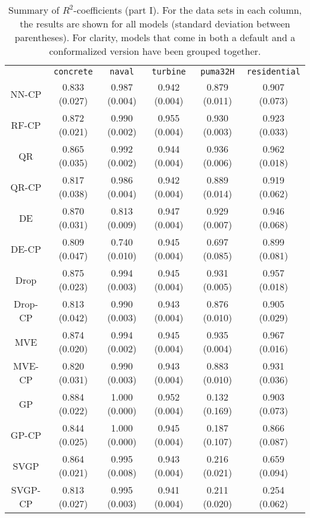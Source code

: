 \documentclass[smallcondensed]{svjour3}
\begin{document}
\begin{appendices}
    \begin{table}[ht!]
        \scriptsize
        \centering
        \renewcommand{\arraystretch}{1.5}
        \begin{tabular}{c||c|c|c|c|c}
            &\texttt{concrete}&\texttt{naval}&\texttt{turbine}&\texttt{puma32H}&\texttt{residential}\\
            \hhline{======}
            NN-CP&0.833 (0.027)&0.987 (0.004)&0.942 (0.004)&0.879 (0.011)&0.907 (0.073)\\
            \hdashline
            RF-CP&0.872 (0.021)&0.990 (0.002)&0.955 (0.004)&0.930 (0.003)&0.923 (0.033)\\
            \hdashline
            QR&0.865 (0.035)&0.992 (0.002)&0.944 (0.004)&0.936 (0.006)&0.962 (0.018)\\
            QR-CP&0.817 (0.038)&0.986 (0.004)&0.942 (0.004)&0.889 (0.014)&0.919 (0.062)\\
            \hdashline
            DE&0.870 (0.031)&0.813 (0.009)&0.947 (0.004)&0.929 (0.007)&0.946 (0.068)\\
            DE-CP&0.809 (0.047)&0.740 (0.010)&0.945 (0.004)&0.697 (0.085)&0.899 (0.081)\\
            \hdashline
            Drop&0.875 (0.023)&0.994 (0.003)&0.945 (0.004)&0.931 (0.005)&0.957 (0.018)\\
            Drop-CP&0.813 (0.042)&0.990 (0.003)&0.943 (0.004)&0.876 (0.010)&0.905 (0.029)\\
            \hdashline
            MVE&0.874 (0.020)&0.994 (0.002)&0.945 (0.004)&0.935 (0.004)&0.967 (0.016)\\
            MVE-CP&0.820 (0.031)&0.990 (0.003)&0.943 (0.004)&0.883 (0.010)&0.931 (0.036)\\
            \hdashline
            GP&0.884 (0.022)&1.000 (0.000)&0.952 (0.004)&0.132 (0.169)&0.903 (0.073)\\
            GP-CP&0.844 (0.025)&1.000 (0.000)&0.945 (0.004)&0.187 (0.107)&0.866 (0.087)\\
            \hdashline
            SVGP&0.864 (0.021)&0.995 (0.008)&0.943 (0.004)&0.216 (0.021)&0.659 (0.094)\\
            SVGP-CP&0.813 (0.027)&0.995 (0.003)&0.941 (0.004)&0.211 (0.020)&0.254 (0.062)\\
        \end{tabular}
        \caption{Summary of $R^2$-coefficients (part I). For the data sets in each column, the results are shown for all models (standard deviation between parentheses). For clarity, models that come in both a default and a conformalized version have been grouped together.}
        \label{table:r2coeff}
    \end{table}


\end{appendices}
\end{document}

